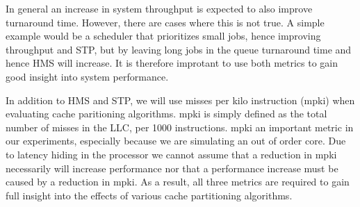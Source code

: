 In general an increase in system throughput is expected to also improve turnaround time.
However, there are cases where this is not true.
A simple example would be a scheduler that prioritizes small jobs, hence improving throughput and STP, but by leaving long jobs in the queue turnaround time and hence HMS will increase.
It is therefore improtant to use both metrics to gain good insight into system performance.

In addition to HMS and STP, we will use misses per kilo instruction (mpki) when evaluating cache paritioning algorithms.
mpki is simply defined as the total number of misses in the LLC, per 1000 instructions.
mpki an important metric in our experiments, especially because we are simulating an out of order core. 
Due to latency hiding in the processor we cannot assume that a reduction in mpki necessarily will increase performance nor that a performance increase must be caused by a reduction in mpki.
As a result, all three metrics are required to gain full insight into the effects of various cache partitioning algorithms.
